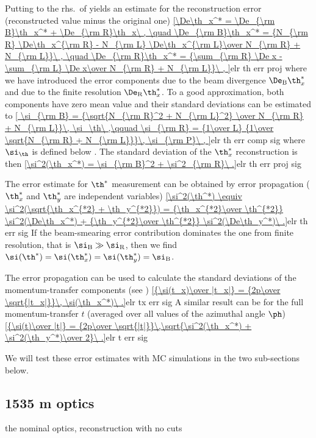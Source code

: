 Putting  to the rhs.~of yields an estimate for the reconstruction error (reconstructed value minus the original one)
\eqref{\De\th_x^* = \De_{\rm B}\th_x^* + \De_{\rm R}\th_x\ ,
	\quad \De_{\rm B}\th_x^* = {N_{\rm R} \De\th_x^{\rm R} - N_{\rm L} \De\th_x^{\rm L}\over N_{\rm R} + N_{\rm L}}\ ,
	\quad \De_{\rm R}\th_x^* = {\sum_{\rm R} \De x - \sum_{\rm L} \De x\over  N_{\rm R} + N_{\rm L}}\ ,
}{elr th err proj}
where we have introduced the error components due to the beam divergence $\De_{\rm B}\th_x^*$ and due to the finite resolution $\De_{\rm R}\th_x^*$. To a good approximation, both components have zero mean value and their standard deviations can be estimated to
\eqref{
	\si_{\rm B} = {\sqrt{N_{\rm R}^2 + N_{\rm L}^2} \over N_{\rm R} + N_{\rm L}}\, \si_\th\ ,\qquad
	\si_{\rm R} = {1\over L} {1\over \sqrt{N_{\rm R} + N_{\rm L}}}\, \si_{\rm P}\ ,
}{elr th err comp sig}
where $\si_\th$ is defined below . The standard deviation of the $\th_x^*$ reconstruction is then
\eqref{\si^2(\th_x^*) = \si_{\rm B}^2 + \si^2_{\rm R}\ .}{elr th err proj sig}

The error estimate for $\th^*$ measurement can be obtained by error propagation ($\th_x^*$ and $\th_y^*$ are independent variables)
\eqref{\si^2(\th^*) \equiv \si^2(\sqrt{\th_x^{*2} + \th_y^{*2}}) = {\th_x^{*2}\over \th^{*2}} \si^2(\De\th_x^*) + {\th_y^{*2}\over \th^{*2}} \si^2(\De\th_y^*)\ .}{elr th err sig}
If the beam-smearing error contribution dominates the one from finite resolution, that is $\si_{\rm B} \gg \si_{\rm R}$, then we find $\si(\th^*) = \si(\th_x^*) = \si(\th_y^*) = \si_{\rm B}$.

The error propagation can be used to calculate the standard deviations of the momentum-transfer components (see )
\eqref{{\si(t_x)\over |t_x|} = {2p\over \sqrt{|t_x|}}\, \si(\th_x^*)\ .}{elr tx err sig}
A similar result can be for the full momentum-transfer $t$ (averaged over all values of the azimuthal angle $\ph$)
\eqref{{\si(t)\over |t|} = {2p\over \sqrt{|t|}}\,\sqrt{\si^2(\th_x^*) + \si^2(\th_y^*)\over 2}\ .}{elr t err sig}

We will test these error estimates with MC simulations in the two sub-sections below.


\subsection[elr 1535]{1535 m optics}

\> the nominal optics, 
\> reconstruction with no cuts


